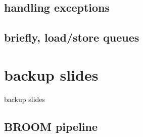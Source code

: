 \subsection{handling exceptions}
 

\subsection{briefly, load/store queues}

\section{backup slides}
\begin{frame}{backup slides}
\end{frame}

\subsection{BROOM pipeline}




